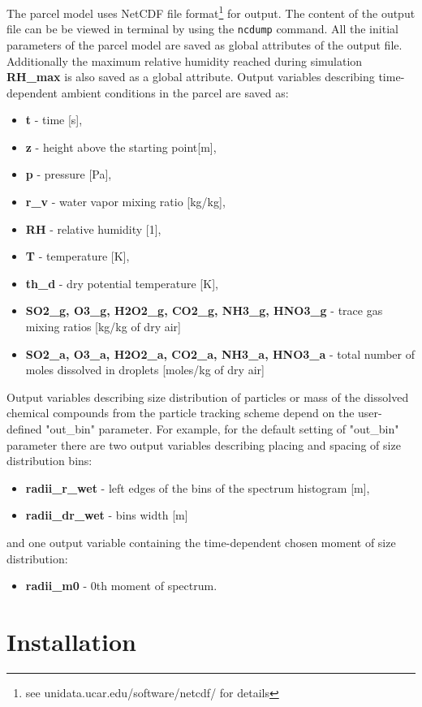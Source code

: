 \documentclass[11pt]{article}
\newcommand{\prog}[1]{{\tt#1}}
\begin{document}
The parcel model uses NetCDF file format\footnote{see unidata.ucar.edu/software/netcdf/ for details} for output.
The content of the output file can be be viewed in terminal by using the \prog{ncdump} command.
All the initial parameters of the parcel model are saved as global attributes of the output file.
Additionally the maximum relative humidity reached during simulation 
  \textbf{RH\_{max}} is also saved as a global attribute.
Output variables describing time-dependent ambient conditions in the parcel are saved as:
\begin{itemize}
  \item \textbf{t} - time [s],
  \item \textbf{z} - height above the starting point[m],
  \item \textbf{p} - pressure [Pa],
  \item \textbf{r\_v} - water vapor mixing ratio [kg/kg],
  \item \textbf{RH} - relative humidity [1],
  \item \textbf{T} - temperature [K],
  \item \textbf{th\_d} - dry potential temperature [K],
  \item \textbf{SO2\_g, O3\_g, H2O2\_g, CO2\_g, NH3\_g, HNO3\_g} - trace gas mixing ratios [kg/kg of dry air]
  \item \textbf{SO2\_a, O3\_a, H2O2\_a, CO2\_a, NH3\_a, HNO3\_a} - total number of moles dissolved in droplets [moles/kg of dry air]
\end{itemize}
\noindent
Output variables describing size distribution of particles or mass of the dissolved chemical compounds 
  from the particle tracking scheme depend on the user-defined "out\_bin" parameter.
For example, for the default setting of "out\_bin" parameter there are two output variables 
  describing placing and spacing of size distribution bins:
\begin{itemize}
  \item \textbf{radii\_r\_wet} - left edges of the bins of the spectrum histogram [m],
  \item \textbf{radii\_dr\_wet} - bins width [m]
\end{itemize}
and one output variable containing the time-dependent chosen moment of size distribution:
\begin{itemize}
  \item \textbf{radii\_m0} - 0th moment of spectrum.
\end{itemize}

\section{Installation}
\end{document}
